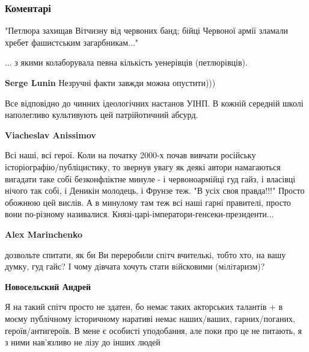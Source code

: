  
 
 
 
 
\subsubsection{Коментарі}

\begin{itemize} %

"Петлюра захищав Вітчизну від червоних банд; бійці Червоної армії зламали
хребет фашистським загарбникам..."

... з якими колаборувала певна кількість уенерівців (петлюрівців).

\begin{itemize} %
\textbf{Serge Lunin} Незручні факти завжди можна опустити)))
\end{itemize} %


Все відповідно до чинних ідеологічних настанов УІНП. В кожній середній школі
наполегливо культивують цей патрійотичний абсурд.

\begin{itemize} %
\textbf{Viacheslav Anissimov} 

Всі наші, всі герої. Коли на початку 2000-х почав вивчати російську
історіографію/публіцистику, то звернув увагу як деякі автори намагаються
вигадати таке собі безконфліктне минуле - і червоноармійці гуд гайз, і власівці
нічого так собі, і Деникін молодець, і Фрунзе теж. "В усіх своя правда!!!"
Просто обожнюю цей вислів. А в минулому там теж всі наші гарні правителі,
просто вони по-різному називалися. Князі-царі-імператори-генсеки-президенти...

\textbf{Alex Marinchenko} 

дозвольте спитати, як би Ви переробили спiтч вчителькi, тобто хто, на вашу
думку, гуд гайс? I чому дiвчата хочуть стати вiйсковими (мiлiтаризм)?


\textbf{Новосельский Андрей} 

Я на такий спітч просто не здатен, бо немає таких акторських талантів + в моєму
публічному історичному наративі немає наших/ваших, гарних/поганих,
героїв/антигероїв. В мене є особисті уподобання, але поки про це не питають, я
з ними нав'язливо не лізу до інших людей


\end{itemize}
\end{itemize}
